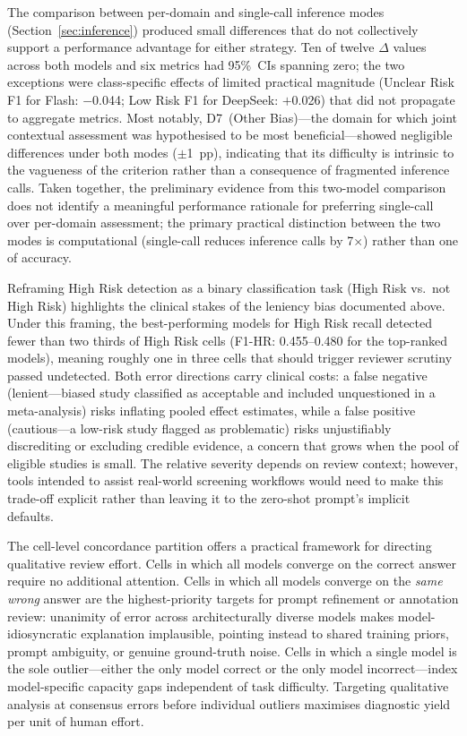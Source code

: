 \documentclass[../main.tex]{subfiles}
\begin{document}
The comparison between per-domain and single-call inference modes
(Section~\ref{sec:inference}) produced small differences that do not
collectively support a performance advantage for either strategy.
Ten of twelve $\Delta$ values across both models and six metrics had 95\%~CIs
spanning zero; the two exceptions were class-specific effects of limited
practical magnitude (Unclear Risk F1 for Flash: $-$0.044; Low Risk F1 for
DeepSeek: $+$0.026) that did not propagate to aggregate metrics.
Most notably, D7~(Other Bias)---the domain for which joint contextual
assessment was hypothesised to be most beneficial---showed negligible
differences under both modes ($\pm$1~pp), indicating that its difficulty
is intrinsic to the vagueness of the criterion rather than a consequence
of fragmented inference calls.
Taken together, the preliminary evidence from this two-model comparison does
not identify a meaningful performance rationale for preferring single-call
over per-domain assessment; the primary practical distinction between the
two modes is computational (single-call reduces inference calls by 7$\times$)
rather than one of accuracy.

Reframing High Risk detection as a binary classification task (High Risk
vs.\ not High Risk) highlights the clinical stakes of the leniency bias
documented above.
Under this framing, the best-performing models for High Risk recall detected
fewer than two thirds of High Risk cells (F1-HR: 0.455--0.480 for the
top-ranked models), meaning roughly one in three cells that should trigger
reviewer scrutiny passed undetected.
Both error directions carry clinical costs: a false negative (lenient---biased
study classified as acceptable and included unquestioned in a meta-analysis)
risks inflating pooled effect estimates, while a false positive (cautious---a
low-risk study flagged as problematic) risks unjustifiably discrediting or
excluding credible evidence, a concern that grows when the pool of eligible
studies is small.
The relative severity depends on review context; however, tools intended to
assist real-world screening workflows would need to make this trade-off
explicit rather than leaving it to the zero-shot prompt's implicit defaults.

The cell-level concordance partition offers a practical framework for directing
qualitative review effort.
Cells in which all models converge on the correct answer require no additional
attention.
Cells in which all models converge on the \emph{same wrong} answer are the
highest-priority targets for prompt refinement or annotation review: unanimity
of error across architecturally diverse models makes model-idiosyncratic
explanation implausible, pointing instead to shared training priors, prompt
ambiguity, or genuine ground-truth noise.
Cells in which a single model is the sole outlier---either the only model
correct or the only model incorrect---index model-specific capacity gaps
independent of task difficulty.
Targeting qualitative analysis at consensus errors before individual outliers
maximises diagnostic yield per unit of human effort.
\end{document}
